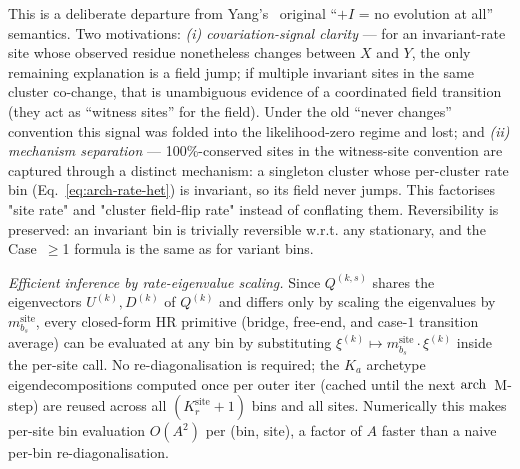 %
This is a deliberate departure from Yang's~\citeyearpar{yang1994maximum}
original ``$+I$ = no evolution at all'' semantics. Two motivations:
\emph{(i) covariation-signal clarity} --- for an invariant-rate site
whose observed residue nonetheless changes between $X$ and $Y$, the
only remaining explanation is a field jump; if multiple invariant
sites in the same cluster co-change, that is unambiguous evidence of
a coordinated field transition (they act as ``witness sites'' for
the field). Under the old ``never changes'' convention this signal
was folded into the likelihood-zero regime and lost; and
\emph{(ii) mechanism separation} --- 100\%-conserved sites in the
witness-site convention are captured through a distinct mechanism:
a singleton cluster whose per-cluster rate bin
(Eq.~\ref{eq:arch-rate-het}) is invariant, so its field never jumps.
This factorises "site rate" and "cluster field-flip rate" instead of
conflating them.
%
Reversibility is preserved: an invariant bin is trivially reversible
w.r.t. any stationary, and the Case~$\geq$1 formula is the same as
for variant bins.

\emph{Efficient inference by rate-eigenvalue scaling.} Since
$Q^{(k, s)}$ shares the eigenvectors $U^{(k)}, D^{(k)}$ of $Q^{(k)}$
and differs only by scaling the eigenvalues by $m^{\mathrm{site}}_{b_s}$,
every closed-form HR primitive (bridge, free-end, and case-$1$
transition average) can be evaluated at any bin by substituting
$\xi^{(k)} \mapsto m^{\mathrm{site}}_{b_s} \cdot \xi^{(k)}$
inside the per-site call. No re-diagonalisation is required; the
$K_a$ archetype eigendecompositions computed once per outer iter
(cached until the next $\mathrm{arch}$~M-step) are reused across all
$(K_r^{\mathrm{site}} + 1)$ bins and all sites. Numerically this makes
per-site bin evaluation $O(A^2)$ per (bin, site), a factor of $A$
faster than a naive per-bin re-diagonalisation.

